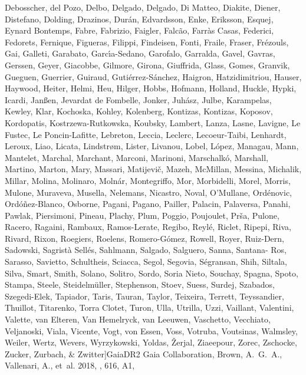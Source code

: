 \documentclass[twocolumn]{aastex62}
\begin{document}
\begin{thebibliography}{}
{  {Debosscher}, {del Pozo}, {Delbo}, {Delgado}, {Delgado}, {Di Matteo},
  {Diakite}, {Diener}, {Distefano}, {Dolding}, {Drazinos}, {Dur{\'a}n},
  {Edvardsson}, {Enke}, {Eriksson}, {Esquej}, {Eynard Bontemps}, {Fabre},
  {Fabrizio}, {Faigler}, {Falc{\~a}o}, {Farr{\`a}s Casas}, {Federici},
  {Fedorets}, {Fernique}, {Figueras}, {Filippi}, {Findeisen}, {Fonti},
  {Fraile}, {Fraser}, {Fr{\'e}zouls}, {Gai}, {Galleti}, {Garabato},
  {Garc{\'\i}a-Sedano}, {Garofalo}, {Garralda}, {Gavel}, {Gavras}, {Gerssen},
  {Geyer}, {Giacobbe}, {Gilmore}, {Girona}, {Giuffrida}, {Glass}, {Gomes},
  {Granvik}, {Gueguen}, {Guerrier}, {Guiraud}, {Guti{\'e}rrez-S{\'a}nchez},
  {Haigron}, {Hatzidimitriou}, {Hauser}, {Haywood}, {Heiter}, {Helmi}, {Heu},
  {Hilger}, {Hobbs}, {Hofmann}, {Holland}, {Huckle}, {Hypki}, {Icardi},
  {Jan{\ss}en}, {Jevardat de Fombelle}, {Jonker}, {Juh{\'a}sz}, {Julbe},
  {Karampelas}, {Kewley}, {Klar}, {Kochoska}, {Kohley}, {Kolenberg},
  {Kontizas}, {Kontizas}, {Koposov}, {Kordopatis}, {Kostrzewa-Rutkowska},
  {Koubsky}, {Lambert}, {Lanza}, {Lasne}, {Lavigne}, {Le Fustec}, {Le
  Poncin-Lafitte}, {Lebreton}, {Leccia}, {Leclerc}, {Lecoeur-Taibi},
  {Lenhardt}, {Leroux}, {Liao}, {Licata}, {Lindstr{\o}m}, {Lister}, {Livanou},
  {Lobel}, {L{\'o}pez}, {Managau}, {Mann}, {Mantelet}, {Marchal}, {Marchant},
  {Marconi}, {Marinoni}, {Marschalk{\'o}}, {Marshall}, {Martino}, {Marton},
  {Mary}, {Massari}, {Matijevi{\v{c}}}, {Mazeh}, {McMillan}, {Messina},
  {Michalik}, {Millar}, {Molina}, {Molinaro}, {Moln{\'a}r}, {Montegriffo},
  {Mor}, {Morbidelli}, {Morel}, {Morris}, {Mulone}, {Muraveva}, {Musella},
  {Nelemans}, {Nicastro}, {Noval}, {O'Mullane}, {Ord{\'e}novic},
  {Ord{\'o}{\~n}ez-Blanco}, {Osborne}, {Pagani}, {Pagano}, {Pailler},
  {Palacin}, {Palaversa}, {Panahi}, {Pawlak}, {Piersimoni}, {Pineau}, {Plachy},
  {Plum}, {Poggio}, {Poujoulet}, {Pr{\v{s}}a}, {Pulone}, {Racero}, {Ragaini},
  {Rambaux}, {Ramos-Lerate}, {Regibo}, {Reyl{\'e}}, {Riclet}, {Ripepi}, {Riva},
  {Rivard}, {Rixon}, {Roegiers}, {Roelens}, {Romero-G{\'o}mez}, {Rowell},
  {Royer}, {Ruiz-Dern}, {Sadowski}, {Sagrist{\`a} Sell{\'e}s}, {Sahlmann},
  {Salgado}, {Salguero}, {Sanna}, {Santana- Ros}, {Sarasso}, {Savietto},
  {Schultheis}, {Sciacca}, {Segol}, {Segovia}, {S{\'e}gransan}, {Shih},
  {Siltala}, {Silva}, {Smart}, {Smith}, {Solano}, {Solitro}, {Sordo}, {Soria
  Nieto}, {Souchay}, {Spagna}, {Spoto}, {Stampa}, {Steele},
  {Steidelm{\"u}ller}, {Stephenson}, {Stoev}, {Suess}, {Surdej}, {Szabados},
  {Szegedi-Elek}, {Tapiador}, {Taris}, {Tauran}, {Taylor}, {Teixeira},
  {Terrett}, {Teyssandier}, {Thuillot}, {Titarenko}, {Torra Clotet}, {Turon},
  {Ulla}, {Utrilla}, {Uzzi}, {Vaillant}, {Valentini}, {Valette}, {van Elteren},
  {Van Hemelryck}, {van Leeuwen}, {Vaschetto}, {Vecchiato}, {Veljanoski},
  {Viala}, {Vicente}, {Vogt}, {von Essen}, {Voss}, {Votruba}, {Voutsinas},
  {Walmsley}, {Weiler}, {Wertz}, {Wevers}, {Wyrzykowski}, {Yoldas},
  {{\v{Z}}erjal}, {Ziaeepour}, {Zorec}, {Zschocke}, {Zucker}, {Zurbach}, \&
  {Zwitter}}]{GaiaDR2}
{Gaia Collaboration}, {Brown}, A.~G.~A., {Vallenari}, A., {et~al.} 2018, \aap,
  616, A1, 


\end{thebibliography}
\end{document}
